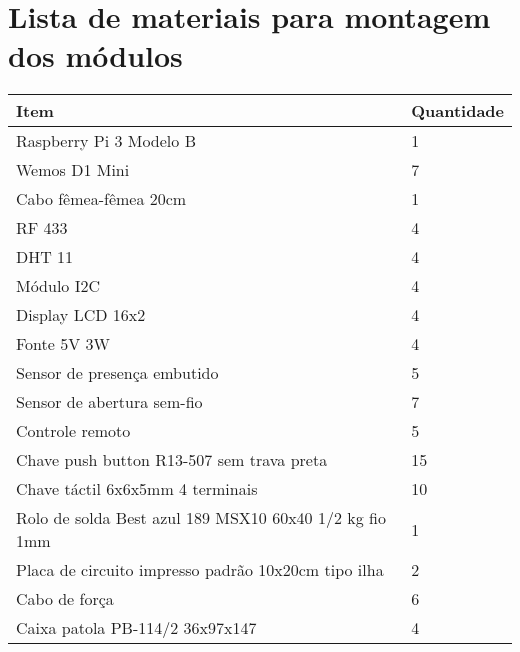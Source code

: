 \chapter{Lista de materiais para montagem dos módulos}
\label{listamateriais}

\begin{tabular}{|l|l|}
\hline
\textbf{Item}                                          & \textbf{Quantidade} \\ \hline
Raspberry Pi 3 Modelo B                                & 1                   \\ \hline
Wemos D1 Mini                                          & 7                   \\ \hline
Cabo fêmea-fêmea 20cm                                  & 1                   \\ \hline
RF 433                                                 & 4                   \\ \hline
DHT 11                                                 & 4                   \\ \hline
Módulo I2C                                             & 4                   \\ \hline
Display LCD 16x2                                       & 4                   \\ \hline
Fonte 5V 3W                                            & 4                   \\ \hline
Sensor de presença embutido                            & 5                   \\ \hline
Sensor de abertura sem-fio                             & 7                   \\ \hline
Controle remoto                                        & 5                   \\ \hline
Chave push button R13-507 sem trava preta              & 15                  \\ \hline
Chave táctil 6x6x5mm 4 terminais                       & 10                  \\ \hline
Rolo de solda Best azul 189 MSX10 60x40 1/2 kg fio 1mm & 1                   \\ \hline
Placa de circuito impresso padrão 10x20cm tipo ilha    & 2                   \\ \hline
Cabo de força                                          & 6                   \\ \hline
Caixa patola PB-114/2 36x97x147                        & 4                   \\ \hline

\end{tabular}
